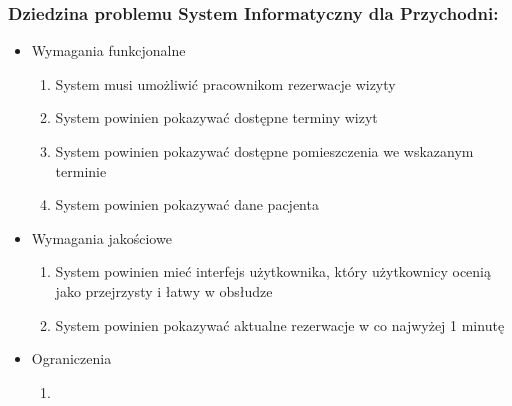 \documentclass{article}
\begin{document}
	\subsubsection*{Dziedzina problemu System Informatyczny dla Przychodni:}
	\begin{itemize}
		\item Wymagania funkcjonalne
		\begin{enumerate}
			\item System musi umożliwić pracownikom rezerwacje wizyty
			\item System powinien pokazywać dostępne terminy wizyt
			\item System powinien pokazywać dostępne pomieszczenia we wskazanym terminie
			\item System powinien pokazywać dane pacjenta
		\end{enumerate}
		\item Wymagania jakościowe
		\begin{enumerate}
			\item System powinien mieć interfejs użytkownika, który użytkownicy ocenią jako przejrzysty i łatwy w obsłudze
			\item System powinien pokazywać aktualne rezerwacje w co najwyżej 1 minutę
		\end{enumerate}
		\item Ograniczenia
		\begin{enumerate}
			\item
		\end{enumerate}
	\end{itemize}
		
\end{document}
